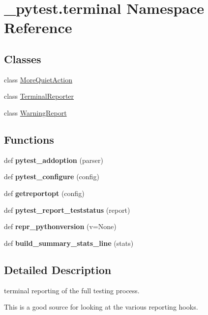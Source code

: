 \hypertarget{namespace__pytest_1_1terminal}{}\section{\+\_\+pytest.\+terminal Namespace Reference}
\label{namespace__pytest_1_1terminal}
\subsection*{Classes}
\begin{DoxyCompactItemize}
\item 
class \hyperlink{class__pytest_1_1terminal_1_1_more_quiet_action}{More\+Quiet\+Action}
\item 
class \hyperlink{class__pytest_1_1terminal_1_1_terminal_reporter}{Terminal\+Reporter}
\item 
class \hyperlink{class__pytest_1_1terminal_1_1_warning_report}{Warning\+Report}
\end{DoxyCompactItemize}
\subsection*{Functions}
\begin{DoxyCompactItemize}
\item 
\mbox{\label{namespace__pytest_1_1terminal_a2ee28ff0e9902bb141cc9b195efe96aa}} 
def {\bfseries pytest\+\_\+addoption} (parser)
\item 
\mbox{\label{namespace__pytest_1_1terminal_a0c036628b579e42c577b61daf887bf78}} 
def {\bfseries pytest\+\_\+configure} (config)
\item 
\mbox{\label{namespace__pytest_1_1terminal_a7f85e390e92ba4ed4e262d429492058a}} 
def {\bfseries getreportopt} (config)
\item 
\mbox{\label{namespace__pytest_1_1terminal_ae907fbad7c762ef9ee20646eaa89280f}} 
def {\bfseries pytest\+\_\+report\+\_\+teststatus} (report)
\item 
\mbox{\label{namespace__pytest_1_1terminal_a3a03b41b7259549747cf609bba19325a}} 
def {\bfseries repr\+\_\+pythonversion} (v=None)
\item 
\mbox{\label{namespace__pytest_1_1terminal_ab52e3cd0a4f228fc47fce1c2fc07a2b9}} 
def {\bfseries build\+\_\+summary\+\_\+stats\+\_\+line} (stats)
\end{DoxyCompactItemize}


\subsection{Detailed Description}
\begin{DoxyVerb}terminal reporting of the full testing process.

This is a good source for looking at the various reporting hooks.
\end{DoxyVerb}
 